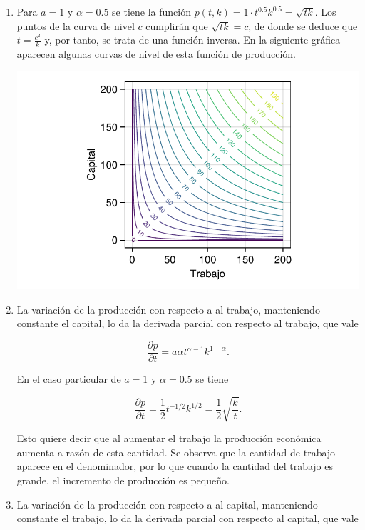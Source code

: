 \documentclass[
  a4paper,
]{scrreport}
\theoremstyle{definition}
\theoremstyle{remark}
\begin{document}
\begin{tcolorbox}[enhanced jigsaw, toprule=.15mm, bottomrule=.15mm, coltitle=black, toptitle=1mm, breakable, left=2mm, arc=.35mm, title=\textcolor{quarto-callout-tip-color}{\faLightbulb}\hspace{0.5em}{Solución}, titlerule=0mm, colback=white, colbacktitle=quarto-callout-tip-color!10!white, colframe=quarto-callout-tip-color-frame, bottomtitle=1mm, rightrule=.15mm, leftrule=.75mm, opacitybacktitle=0.6, opacityback=0]

\begin{enumerate}
\def\labelenumi{\alph{enumi}.}
\item
  Para \(a=1\) y \(\alpha=0.5\) se tiene la función
  \(p(t,k)=1 \cdot t^{0.5}k^{0.5} = \sqrt{tk}\). Los puntos de la curva
  de nivel \(c\) cumplirán que \(\sqrt{tk} = c\), de donde se deduce que
  \(t=\frac{c^2}{k}\) y, por tanto, se trata de una función inversa. En
  la siguiente gráfica aparecen algunas curvas de nivel de esta función
  de producción.

  \includegraphics{11-derivadas-funciones-varias-variables_files/figure-pdf/cell-3-output-1.pdf}
\item
  La variación de la producción con respecto a al trabajo, manteniendo
  constante el capital, lo da la derivada parcial con respecto al
  trabajo, que vale

  \[
  \frac{\partial p}{\partial t} = a\alpha t^{\alpha-1}k^{1-\alpha}.
  \]

  En el caso particular de \(a=1\) y \(\alpha=0.5\) se tiene

  \[
  \frac{\partial p}{\partial t} = \frac{1}{2}t^{-1/2}k^{1/2} = \frac{1}{2}\sqrt{\frac{k}{t}}.
  \]

  Esto quiere decir que al aumentar el trabajo la producción económica
  aumenta a razón de esta cantidad. Se observa que la cantidad de
  trabajo aparece en el denominador, por lo que cuando la cantidad del
  trabajo es grande, el incremento de producción es pequeño.
\item
  La variación de la producción con respecto a al capital, manteniendo
  constante el trabajo, lo da la derivada parcial con respecto al
  capital, que vale


\end{enumerate}
\end{tcolorbox}
\end{document}
